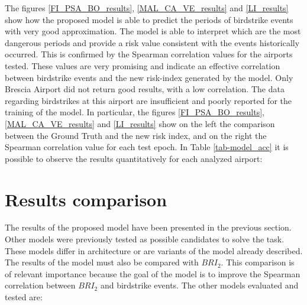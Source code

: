 The figures \ref{FI_PSA_BO_results}, \ref{MAL_CA_VE_results} and \ref{LI_results} show how the proposed model is able to predict the periods of birdstrike events with very good approximation. The model is able to interpret which are the most dangerous periods and provide a risk value consistent with the events historically occurred.
This is confirmed by the Spearman correlation values for the airports tested.
These values are very promising and indicate an effective correlation between birdstrike events and the new risk-index generated by the model.
Only Brescia Airport did not return good results, with a low correlation.  The data regarding birdstrikes at this airport are insufficient and poorly reported for the training of the model.
In particular, the figures \ref{FI_PSA_BO_results}, \ref{MAL_CA_VE_results} and \ref{LI_results} show on the left the comparison between the Ground Truth and the new risk index, and on the right the Spearman correlation value for each test epoch.
In Table \ref{tab-model_acc} it is possible to observe the results quantitatively for each analyzed airport:

\begin{table}
	\centering
	\caption{Proposed Model accuracy (Spearman correlation) against the results obtained with $BRI_2$.}
	\label{tab-model_acc}
\end{table}

\section{Results comparison}
The results of the proposed model have been presented in the previous section.
Other models were previously tested as possible candidates to solve the task. These models differ in architecture or are variants of the model already described.
The results of the model must also be compared with $BRI_2$. This comparison is of relevant importance because the goal of the model is to improve the Spearman correlation between $BRI_2$ and birdstrike events. 
The other models evaluated and tested are:

